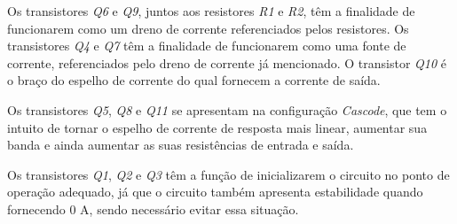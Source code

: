 Os transistores \emph{Q6} e \emph{Q9}, juntos aos resistores \emph{R1} e \emph{R2}, t\^em a finalidade de funcionarem como um dreno de corrente referenciados pelos resistores. Os transistores \emph{Q4} e \emph{Q7} t\^em a finalidade de funcionarem como uma fonte de corrente, referenciados pelo dreno de corrente j\'a mencionado. O transistor \emph{Q10} \'e o bra{\c c}o do espelho de corrente do qual fornecem a corrente de sa\'ida.

Os transistores \emph{Q5}, \emph{Q8} e \emph{Q11} se apresentam na configura{\c c}\~ao \emph{Cascode}, que tem o intuito de tornar o espelho de corrente de resposta mais linear, aumentar sua banda e ainda aumentar as suas resist\^encias de entrada e sa\'ida.

Os transistores \emph{Q1}, \emph{Q2} e \emph{Q3} t\^em a fun{\c c}\~ao de inicializarem o circuito no ponto de opera{\c c}\~ao adequado, j\'a que o circuito tamb\'em apresenta estabilidade quando fornecendo 0 A, sendo necess\'ario evitar essa situa{\c c}\~ao.
\clearpage